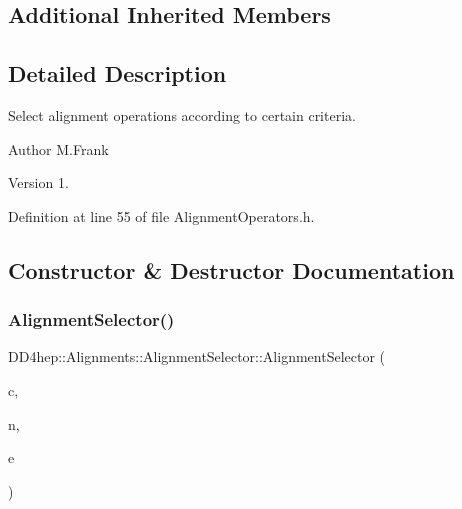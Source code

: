 \subsection*{Additional Inherited Members}


\subsection{Detailed Description}
Select alignment operations according to certain criteria. 

\begin{DoxyAuthor}{Author}
M.\+Frank 
\end{DoxyAuthor}
\begin{DoxyVersion}{Version}
1. 
\end{DoxyVersion}


Definition at line 55 of file Alignment\+Operators.\+h.



\subsection{Constructor \& Destructor Documentation}
\hypertarget{class_d_d4hep_1_1_alignments_1_1_alignment_selector_a00da94ed989a3b504636f2c22ad6641e}{}\label{class_d_d4hep_1_1_alignments_1_1_alignment_selector_a00da94ed989a3b504636f2c22ad6641e} 
\subsubsection{\texorpdfstring{Alignment\+Selector()}{AlignmentSelector()}}
{\footnotesize\ttfamily D\+D4hep\+::\+Alignments\+::\+Alignment\+Selector\+::\+Alignment\+Selector (\begin{DoxyParamCaption}\item[{\hyperlink{class_d_d4hep_1_1_alignments_1_1_global_alignment_cache}{Global\+Alignment\+Cache} \&}]{c,  }\item[{\hyperlink{class_d_d4hep_1_1_alignments_1_1_alignment_operator_a2f25eae1d38abc30a09f7a840ab0662a}{Nodes} \&}]{n,  }\item[{const \hyperlink{class_d_d4hep_1_1_alignments_1_1_alignment_operator_ada83b10531c5774c75f6e8c224f55f4c}{Entries} \&}]{e }\end{DoxyParamCaption})\hspace{0.3cm}{\ttfamily [inline]}}



